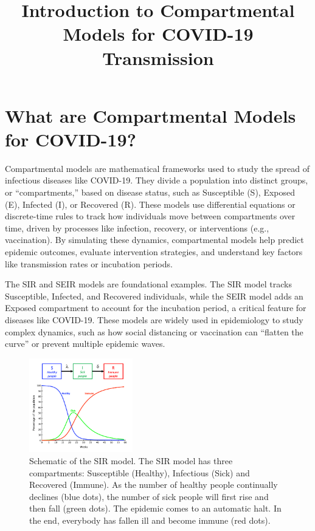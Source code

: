\documentclass{article}
\title{Introduction to Compartmental Models for COVID-19 Transmission}
\begin{document}
\maketitle

\section{What are Compartmental Models for COVID-19?}

Compartmental models are mathematical frameworks used to study the spread of infectious diseases like COVID-19. They divide a population into distinct groups, or ``compartments,'' based on disease status, such as Susceptible (S), Exposed (E), Infected (I), or Recovered (R). These models use differential equations or discrete-time rules to track how individuals move between compartments over time, driven by processes like infection, recovery, or interventions (e.g., vaccination). By simulating these dynamics, compartmental models help predict epidemic outcomes, evaluate intervention strategies, and understand key factors like transmission rates or incubation periods.

The SIR and SEIR models are foundational examples. The SIR model tracks Susceptible, Infected, and Recovered individuals, while the SEIR model adds an Exposed compartment to account for the incubation period, a critical feature for diseases like COVID-19. These models are widely used in epidemiology to study complex dynamics, such as how social distancing or vaccination can ``flatten the curve'' or prevent multiple epidemic waves.

\begin{figure}[htbp]
  \centering
  \includegraphics[width=0.4\textwidth]{lesson_3/images/sir_model.png}
  \caption{Schematic of the SIR model. The SIR model has three compartments: Susceptible (Healthy), Infectious (Sick) and Recovered (Immune). As the number of healthy people continually declines (blue dots), the number of sick people will first rise and then fall (green dots). The epidemic comes to an automatic halt. In the end, everybody has fallen ill and become immune (red dots).}
  \label{fig:seir-diagram}
\end{figure}
\end{document}
